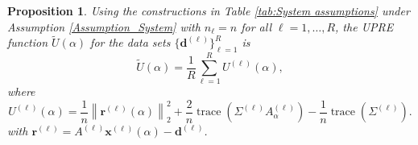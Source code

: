 \documentclass[12pt]{article}
\newcommand{\dVec}{\mathbf{d}}	%
\newcommand{\rVec}{\mathbf{r}}	%
\newcommand{\xVec}{\mathbf{x}}	%
\DeclareMathOperator{\trace}{trace}		%
\newcommand{\regparam}{\alpha}  %
\newcommand{\U}{U}	%
\newtheorem{proposition}{Proposition}[section]
\begin{document}
\begin{proposition}
Using the constructions in Table \ref{tab:System assumptions} under Assumption \ref{Assumption_System} with $n_\ell = n$ for all $\ell = 1,\ldots,R$, the UPRE function $\widetilde{U}(\regparam)$ for the data sets $\{\dVec^{(\ell)}\}_{\ell=1}^R$ is
\begin{equation}
\label{eq:Averaged UPRE}
\widetilde{\U}(\regparam) = \frac{1}{R} \sum_{\ell=1}^R \U^{(\ell)}(\regparam),
\end{equation}
where
\begin{equation}
\label{eq:Individual UPRE}
\U^{(\ell)}(\regparam) = \frac{1}{n}\left\|\rVec^{(\ell)}(\regparam)\right\|_2^2 + \frac{2}{n} \trace\left(\Sigma^{(\ell)} A_\regparam^{(\ell)}\right) - \frac{1}{n} \trace\left(\Sigma^{(\ell)}\right).
\end{equation}
with $\rVec^{(\ell)} = A^{(\ell)}\xVec^{(\ell)}(\regparam) - \dVec^{(\ell)}$.
\end{proposition}
\end{document}
